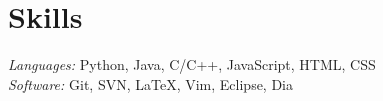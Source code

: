 \section*{Skills}
\textsl{Languages:} Python, Java, C/C++, JavaScript, HTML, CSS \\
\textsl{Software:} Git, SVN, \LaTeX, Vim, Eclipse, Dia

